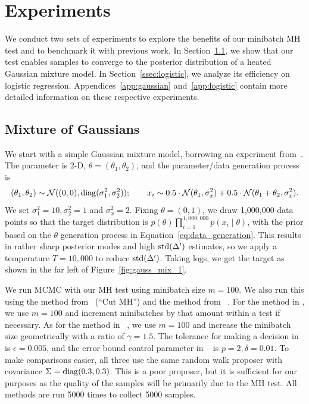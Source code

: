 \documentclass{article}
\begin{document}
\section{Experiments}\label{sec:experiments}

We conduct two sets of experiments to explore the benefits of our minibatch MH
test and to benchmark it with previous work. In Section~\ref{ssec:gaussians}, we
show that our test enables samples to converge to the posterior distribution of
a heated Gaussian mixture model. In Section~\ref{ssec:logistic}, we analyze its
efficiency on logistic regression.  Appendices~\ref{app:gaussian}
and~\ref{app:logistic} contain more detailed information on these respective
experiments.

\subsection{Mixture of Gaussians}\label{ssec:gaussians}

We start with a simple Gaussian mixture model, borrowing an experiment from~\cite{langevin_2011}.
The parameter is 2-D, $\theta = (\theta_1,\theta_2)$, and the parameter/data generation process is
\begin{equation}\label{eq:data_generation}
(\theta_1,\theta_2) \sim \mathcal{N}((0,0), {\rm diag}(\sigma_1^2, \sigma_2^2));\quad \quad x_i \sim
0.5 \cdot \mathcal{N}(\theta_1, \sigma_x^2) + 0.5 \cdot \mathcal{N}(\theta_1+\theta_2, \sigma_x^2).
\end{equation}
We set $\sigma_1^2 = 10, \sigma_2^2 = 1$ and $\sigma_x^2=2$. Fixing $\theta = (0,1)$, we draw 1,000,000
data points so that the target distribution is $p(\theta)\prod_{i=1}^{1,000,000}p(x_i\mid \theta)$, with
the prior based on the $\theta$ generation process in Equation~\ref{eq:data_generation}. This
results in rather sharp posterior modes and high ${\rm std}(\Delta')$ estimates, so we apply a
temperature $T=10,000$ to reduce ${\rm std}(\Delta')$. Taking logs, we get the target as shown in the
far left of Figure~\ref{fig:gauss_mix_1}.

We run MCMC with our MH test using minibatch size $m=100$. %
We also run this using the method from~\cite{cutting_mh_2014} (``Cut MH'')  and the method from 
~\cite{icml2014c1_bardenet14}. For the method in \cite{cutting_mh_2014}, we use $m=100$ and
increment minibatches by that amount within a test if necessary. As for the method in ~\cite{icml2014c1_bardenet14}, we use $m=100$ and increase the minibatch size geometrically with a ratio of $\gamma = 1.5$. The tolerance for making a
decision in \cite{cutting_mh_2014} is $\epsilon=0.005$, and the error bound control parameter in ~\cite{icml2014c1_bardenet14} is $p = 2, \delta = 0.01$. To make comparisons easier, all three use the same random walk proposer with covariance $\Sigma={\rm diag}(0.3, 0.3)$. This is a poor proposer, but it is sufficient for
our purposes as the quality of the samples will be primarily due to the MH test. All methods are run
5000 times to collect 5000 samples.
\end{document}
